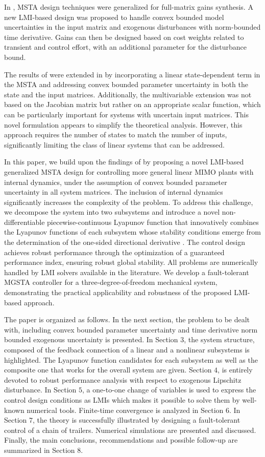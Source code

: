 \documentclass[twocolumn]{autarc_LH}
\begin{document}
In \cite{gero:2023}, MSTA design techniques were generalized for full-matrix gains synthesis. A new LMI-based design was proposed to handle convex bounded model uncertainties in the input matrix and exogenous disturbances with norm-bounded time derivative. Gains can then be designed based on cost weights related to transient and control effort, with an additional parameter for the disturbance bound. 

The results of \cite{gero:2023} were extended in 
\cite{NGH:2024} by incorporating a linear state-dependent term in the MSTA and addressing convex bounded parameter uncertainty in both the state and the input matrices. Additionally, the multivariable extension was not based on the Jacobian matrix but rather on an appropriate scalar function, which can be particularly important for systems with uncertain input matrices. This novel formulation appears to simplify the theoretical analysis. However, this approach requires the number of states to match the number of inputs, significantly limiting the class of linear systems that can be addressed. 

In this paper, we build upon the findings of \cite{NGH:2024} by proposing a novel LMI-based generalized MSTA design for controlling more general linear MIMO plants with internal dynamics, under the assumption of convex bounded parameter uncertainty in all system matrices. The inclusion of internal dynamics significantly increases the complexity of the problem. To address this challenge, we decompose the system into two subsystems and introduce a novel non-differentiable piecewise-continuous Lyapunov function that innovatively combines the Lyapunov functions of each subsystem whose stability conditions emerge from the determination of the one-sided directional derivative \cite{ShePa:1994}. The control design achieves robust performance through the optimization of a guaranteed performance index, ensuring robust global stability. All problems are numerically handled by LMI solvers available in the literature. We develop a fault-tolerant MGSTA controller for a three-degree-of-freedom mechanical system, demonstrating the practical applicability and robustness of the proposed LMI-based approach.

The paper is organized as follows. In the next section, the problem to be dealt with, including convex bounded parameter uncertainty and time derivative norm bounded exogenous uncertainty is presented. In Section $3$, the system structure, composed of the feedback connection of a linear and a nonlinear subsystems is highlighted. The Lyapunov function candidates for each subsystem as well as the composite one that works for the overall system are given. Section $4$, is entirely devoted to robust performance analysis with respect to  exogenous Lipschitz disturbance. In Section $5$, a one-to-one change of variables is used to express the control design conditions as LMIs which makes it possible to solve them by well-known numerical tools. Finite-time convergence is analyzed in Section $6$. In Section $7$, the theory is successfully illustrated by designing a fault-tolerant control of a chain of trailers. Numerical simulations are presented and discussed. Finally, the main conclusions, recommendations and possible follow-up are summarized in Section $8$. 
\end{document}
